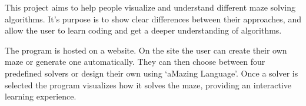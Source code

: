 This project aims to help people visualize and understand different maze solving algorithms. It’s purpose is to show clear differences between their approaches, and allow the user to learn coding and get a deeper understanding of algorithms.

The program is hosted on a website. On the site the user can create their own maze or generate one automatically. They can then choose between four predefined solvers or design their own using ‘aMazing Language’. Once a solver is selected the program visualizes how it solves the maze, providing an interactive learning experience.
